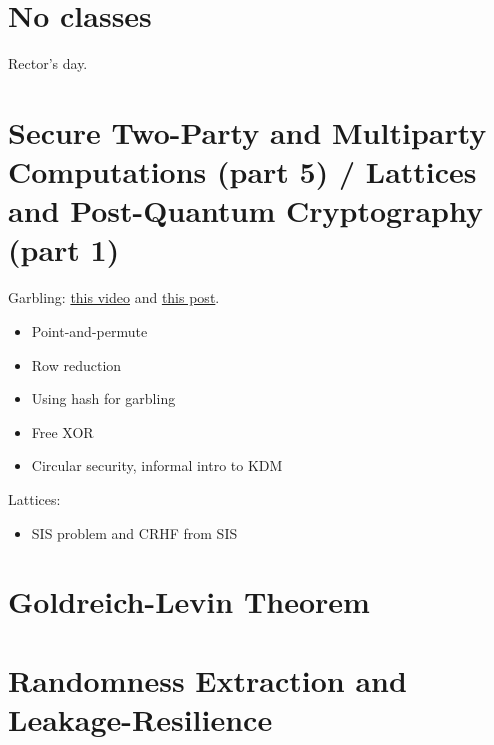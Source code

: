 \documentclass{llncs}
\begin{document}
\section{No classes}
Rector's day.

\section{Secure Two-Party and Multiparty Computations (part 5) / Lattices and Post-Quantum Cryptography (part 1)}
Garbling: \href{https://www.youtube.com/watch?v=FTxh908u9y8}{this video} and \href{https://blog.cryptographyengineering.com/2012/04/27/wonk-post-circular-security/}{this post}.
\begin{itemize}
	\item Point-and-permute
	\item Row reduction
	\item Using hash for garbling
	\item Free XOR
	\item Circular security, informal intro to KDM
\end{itemize}

Lattices:
\begin{itemize}
	\item SIS problem and CRHF from SIS
\end{itemize}

\section{Goldreich-Levin Theorem}

\section{Randomness Extraction and Leakage-Resilience}


\printbibliography %
\end{document}

